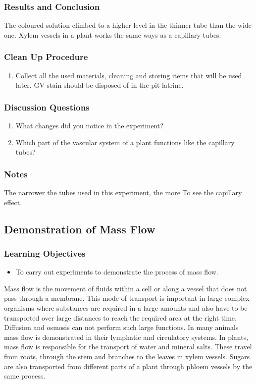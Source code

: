 \subsubsection*{Results and Conclusion}
The coloured solution climbed to a higher level in the thinner tube than the wide one. Xylem vessels in a plant works the same ways as a capillary tubes.

\subsubsection*{Clean Up Procedure}
\begin{enumerate}
\item{Collect all the used materials, cleaning and storing items that will be used later. GV stain should be disposed of in the pit latrine.}
\end{enumerate}

\subsubsection*{Discussion Questions}
\begin{enumerate}
\item{What changes did you notice in the experiment?}
\item{Which part of the vascular system of a plant functions like the capillary tubes?}
\end{enumerate}

\subsubsection*{Notes}
The narrower the tubes used in this experiment, the more To see the capillary effect.

\subsection{Demonstration of Mass Flow}

\subsubsection*{Learning Objectives}
\begin{itemize}
\item{To carry out experiments to demonstrate the process of mass flow.}
\end{itemize}


Mass flow is the movement of fluids within a cell or along a vessel that does not pass through a membrane. This mode of transport is important in large complex organisms where substances are required in a large amounts and also have to be transported over large distances to reach the required area at the right time. Diffusion and osmosis can not perform such large functions. In many animals mass flow is demonstrated in their lymphatic and circulatory systems. In plants, mass flow is responsible for the transport of water and mineral salts. These travel from roots, through the stem and branches to the leaves in xylem vessels. Sugars are also transported from different parts of a plant through phloem vessels by the same process.

